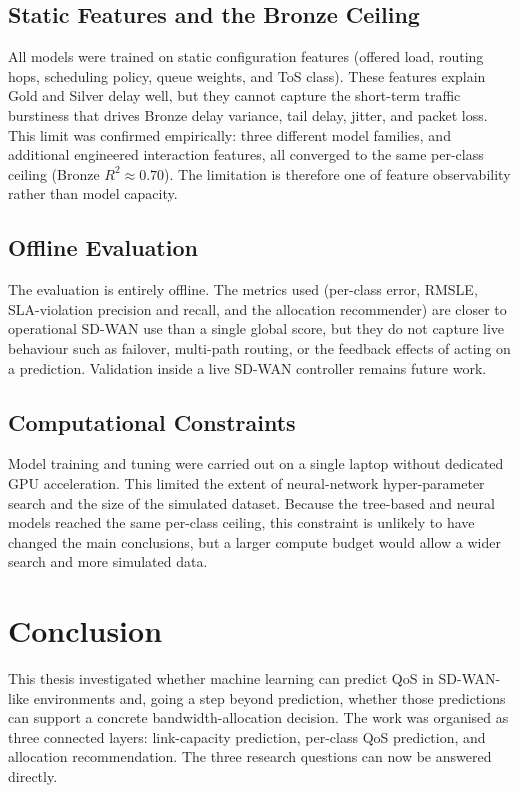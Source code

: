 \documentclass[a4paper,12pt]{Classes/RoboticsLaTeX}
\begin{document}
\section{Static Features and the Bronze Ceiling}

All models were trained on static configuration features (offered load, routing hops, scheduling policy, queue weights, and ToS class). These features explain Gold and Silver delay well, but they cannot capture the short-term traffic burstiness that drives Bronze delay variance, tail delay, jitter, and packet loss. This limit was confirmed empirically: three different model families, and additional engineered interaction features, all converged to the same per-class ceiling (Bronze $R^2 \approx 0.70$). The limitation is therefore one of feature observability rather than model capacity.

\section{Offline Evaluation}

The evaluation is entirely offline. The metrics used (per-class error, RMSLE, SLA-violation precision and recall, and the allocation recommender) are closer to operational SD-WAN use than a single global score, but they do not capture live behaviour such as failover, multi-path routing, or the feedback effects of acting on a prediction. Validation inside a live SD-WAN controller remains future work.

\section{Computational Constraints}

Model training and tuning were carried out on a single laptop without dedicated GPU acceleration. This limited the extent of neural-network hyper-parameter search and the size of the simulated dataset. Because the tree-based and neural models reached the same per-class ceiling, this constraint is unlikely to have changed the main conclusions, but a larger compute budget would allow a wider search and more simulated data.

\chapter{Conclusion}
\label{chap:conclusion}

This thesis investigated whether machine learning can predict QoS in SD-WAN-like environments and, going a step beyond prediction, whether those predictions can support a concrete bandwidth-allocation decision. The work was organised as three connected layers: link-capacity prediction, per-class QoS prediction, and allocation recommendation. The three research questions can now be answered directly.
\end{document}
